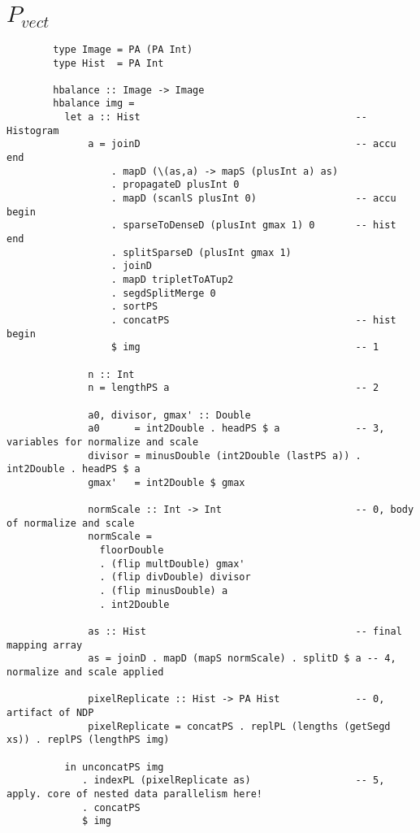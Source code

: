 \documentclass{article}
\newcommand{\ndpv}[0]{$P_{vect}$}
\begin{document}
    \section{\ndpv}
      \begin{lstlisting}
        type Image = PA (PA Int)
        type Hist  = PA Int

        hbalance :: Image -> Image
        hbalance img =
          let a :: Hist                                     -- Histogram
              a = joinD                                     -- accu end
                  . mapD (\(as,a) -> mapS (plusInt a) as)
                  . propagateD plusInt 0
                  . mapD (scanlS plusInt 0)                 -- accu begin
                  . sparseToDenseD (plusInt gmax 1) 0       -- hist end
                  . splitSparseD (plusInt gmax 1)
                  . joinD
                  . mapD tripletToATup2
                  . segdSplitMerge 0
                  . sortPS
                  . concatPS                                -- hist begin
                  $ img                                     -- 1
                      
              n :: Int
              n = lengthPS a                                -- 2
              
              a0, divisor, gmax' :: Double
              a0      = int2Double . headPS $ a             -- 3, variables for normalize and scale
              divisor = minusDouble (int2Double (lastPS a)) . int2Double . headPS $ a
              gmax'   = int2Double $ gmax
              
              normScale :: Int -> Int                       -- 0, body of normalize and scale
              normScale =
                floorDouble
                . (flip multDouble) gmax'
                . (flip divDouble) divisor
                . (flip minusDouble) a
                . int2Double
              
              as :: Hist                                    -- final mapping array
              as = joinD . mapD (mapS normScale) . splitD $ a -- 4, normalize and scale applied
              
              pixelReplicate :: Hist -> PA Hist             -- 0, artifact of NDP
              pixelReplicate = concatPS . replPL (lengths (getSegd xs)) . replPS (lengthPS img)
              
          in unconcatPS img
             . indexPL (pixelReplicate as)                  -- 5, apply. core of nested data parallelism here!
             . concatPS
             $ img
      \end{lstlisting}
    
\end{document}

